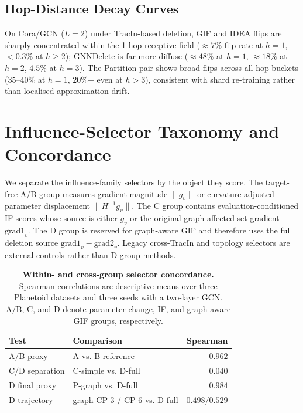 \subsection{Hop-Distance Decay Curves}
On Cora/GCN ($L{=}2$) under TracIn-based deletion, GIF and IDEA
flips are sharply concentrated within the 1-hop receptive field
(${\approx}7\%$ flip rate at $h{=}1$, ${<}0.3\%$ at $h{\ge}2$);
GNNDelete is far more diffuse (${\approx}48\%$ at $h{=}1$,
${\approx}18\%$ at $h{=}2$, $4.5\%$ at $h{=}3$). The Partition pair
shows broad flips across all hop buckets ($35$--$40\%$ at $h{=}1$,
$20\%$+ even at $h{>}3$), consistent with shard re-training rather
than localised approximation drift.

\section{Influence-Selector Taxonomy and Concordance}
\label{app:if-gif-taxonomy}

We separate the influence-family selectors by the object they score.
The target-free A/B group measures gradient magnitude
$\lVert g_v\rVert$ or curvature-adjusted parameter displacement
$\lVert H^{-1}g_v\rVert$.  The C group contains evaluation-conditioned
IF scores whose source is either $g_v$ or the original-graph affected-set
gradient $\mathrm{grad1}_v$.  The D group is reserved for graph-aware GIF
and therefore uses the full deletion source
$\mathrm{grad1}_v-\mathrm{grad2}_v$.  Legacy cross-TracIn and topology
selectors are external controls rather than D-group methods.

\begin{table}[h]
\centering
\small
\caption{\textbf{Within- and cross-group selector concordance.}
Spearman correlations are descriptive means over three Planetoid datasets
and three seeds with a two-layer GCN.  A/B, C, and D denote parameter-change,
IF, and graph-aware GIF groups, respectively.}
\label{tab:if-gif-concordance}
\begin{tabular}{@{}llr@{}}
\toprule
Test & Comparison & Spearman \\
\midrule
A/B proxy & A vs. B reference & $0.962$ \\
C/D separation & C-simple vs. D-full & $0.040$ \\
D final proxy & P-graph vs. D-full & $0.984$ \\
D trajectory & graph CP-3 / CP-6 vs. D-full & $0.498/0.529$ \\
\bottomrule
\end{tabular}
\end{table}

